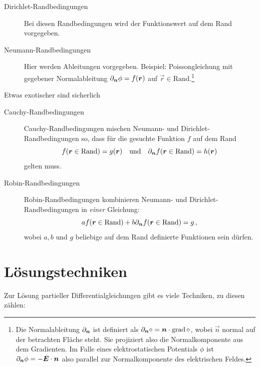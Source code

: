 \documentclass[paper=a4, fontsize=11.0pt, abstractoff, DIV12]{scrartcl}
\begin{document}
\begin{description}
    \item[Dirichlet-Randbedingungen]
    Bei diesen Randbedingungen wird der Funktionswert auf dem Rand vorgegeben.
    \item[Neumann-Randbedingungen]
    Hier werden Ableitungen vorgegeben. Beispiel: Poissongleichung mit gegebener
    Normalableitung $\partial_{{\boldsymbol{n}}} \phi = f({\boldsymbol{r}})$ auf $\vec r \in \text{Rand}$.\footnote{Die Normalableitung $\partial_{{\boldsymbol{n}}}$ ist definiert als $\partial_{{\boldsymbol{n}}} \circ = {\boldsymbol{n}} \cdot \operatorname{grad} \circ$, wobei $\vec n$ normal auf der betrachten Fläche steht.
    Sie projiziert also die Normalkomponente aus dem Gradienten. Im Falle eines
    elektrostatischen Potentials $\phi$ ist $\partial_{{\boldsymbol{n}}} \phi = -{\boldsymbol{E}} \cdot {\ensuremath{\boldsymbol{n}}}$
    also parallel zur Normalkomponente des elektrischen Feldes.}
\end{description}
Etwas exotischer sind sicherlich
\begin{description}
    \item[Cauchy-Randbedingungen]
    Cauchy-Randbedingungen mischen Neumann- und
    Dir\-ich\-let-Rand\-be\-ding\-ung\-en so, dass für die gesuchte Funktion $f$ auf
    dem Rand
    \[f({\boldsymbol{r}} \in \text{Rand}) = g({\boldsymbol{r}})\quad\text{und}\quad\partial_{{\boldsymbol{n}}} f({\boldsymbol{r}}\in \text{Rand}) = h({\boldsymbol{r}})\]
    gelten muss.
    \item[Robin-Randbedingungen]
    Robin-Randbedingungen kombinieren Neumann- und Dir\-ich\-let-Rand\-be\-ding\-ung\-en in
    \emph{einer} Gleichung:
    \[a f({\boldsymbol{r}} \in \text{Rand}) + b \partial_{{\boldsymbol{n}}} f({\boldsymbol{r}} \in \text{Rand}) = g\,,\]
    wobei $a, b$ und $g$ beliebige auf dem Rand definierte Funktionen sein dürfen.

\end{description}


\section{Lösungstechniken}

Zur Lösung partieller Differentialgleichungen gibt es viele Techniken, zu diesen zählen:
\end{document}
